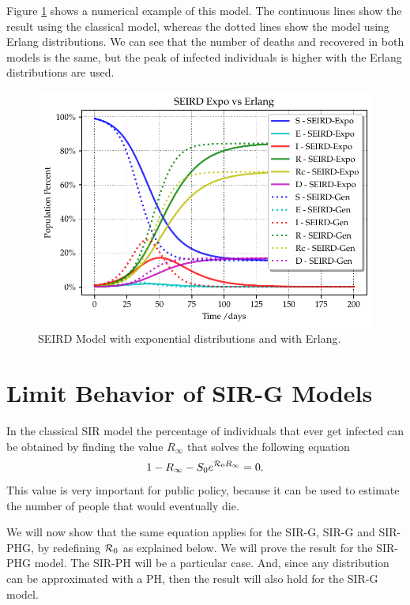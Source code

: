 \documentclass[USenglish,10pt]{article}
\newcommand{\Ro}{\ensuremath\mathcal{R}_0\xspace}
\newcommand{\Ri}{\ensuremath{R}_\infty\xspace}
\begin{document}
Figure \ref{fg:seird} shows a numerical example of this model. The continuous lines show the result using the classical model, whereas the dotted lines show the model using Erlang distributions. We can see that the number of deaths and recovered in both models is the same, but the peak of infected individuals is higher with the Erlang distributions are used.


\begin{figure}
    \centering
    \includegraphics[width=0.9\linewidth]{figures/SEIRD}
    \caption[SEIRD Model]{SEIRD Model with exponential distributions and with Erlang.}
    \label{fg:seird}
\end{figure}

\section{Limit Behavior of SIR-G Models} \label{sc:limit}

In the classical SIR model the percentage of individuals that ever get infected can be obtained by finding the value $\Ri$ that solves the following equation \cite{chas09}
\[ 1-\Ri - S_0e^{\Ro \Ri}=0.\]
This value is very important for public policy, because it can be used to estimate the number of people that would eventually die.

We will now show that the same equation applies for the SIR-G, SIR-G and SIR-PHG, by redefining $\Ro$ as explained below. We will prove the result for the SIR-PHG model.
The SIR-PH will be a particular case. And, since any distribution can be approximated with a PH, then the result will also hold for the SIR-G model.
\end{document}
